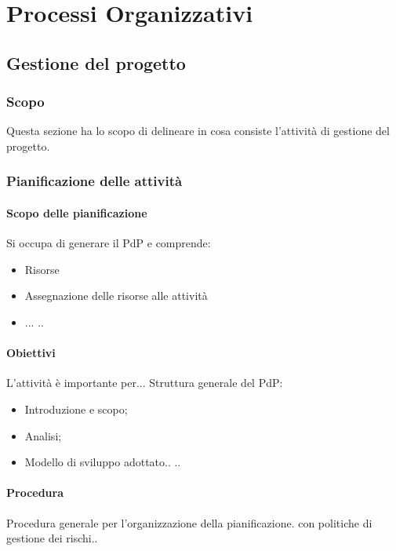 \section{Processi Organizzativi}


    \subsection{Gestione del progetto}

	    \subsubsection{Scopo}
	    Questa sezione ha lo scopo di delineare in cosa consiste l'attività di gestione del progetto.


		\subsubsection{Pianificazione delle attività}

			\paragraph{Scopo delle pianificazione}
			Si occupa di generare il PdP e comprende:
			\begin{itemize}
				\item Risorse
				\item Assegnazione delle risorse alle attività
				\item ...
				..
			\end{itemize}

			\paragraph{Obiettivi}
			L'attività è importante per...
			Struttura generale del PdP:
			\begin{itemize}
				\item Introduzione e scopo;
				\item Analisi;
				\item Modello di sviluppo adottato..
				..
			\end{itemize}

			\paragraph{Procedura}
			Procedura generale per l’organizzazione della pianificazione.
			con politiche di gestione dei rischi..

